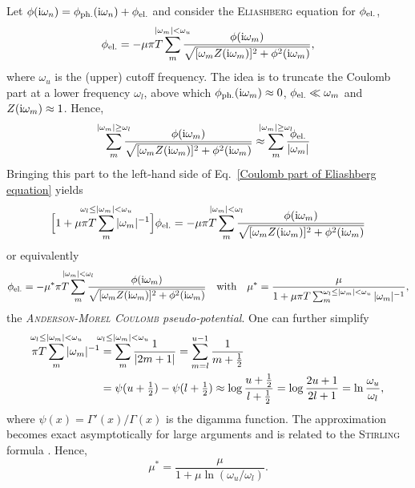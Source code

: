 Let $\phi(\mathrm i \omega_n) = \phi \sb{\text{ph.}} (\mathrm i \omega_n) + \phi \sb{\text{el.}}$ and
consider the \textsc{Eliashberg} equation for $\phi \sb{\text{el.}}$,
%
\begin{equation} \label{Coulomb part of Eliashberg equation}
    \phi \sub{el.} = -\mu \pi T \sum_m^{\mathclap{|\omega_m| < \omega_u}}
    \frac
        {\phi(\I \omega_m)}
        {\sqrt{[\omega_m Z(\I \omega_m)]^2 + \phi^2(\I \omega_m)}},
\end{equation}
%
where $\omega_u$ is the (upper) cutoff frequency. The idea is to truncate the
Coulomb part at a lower frequency $\omega_l$, above which $\phi \sb{\text{ph.}} (\mathrm i
\omega_m) \approx 0$, $\phi \sb{\text{el.}} \ll \omega_m$ and $Z(\mathrm i \omega_m) \approx
1$. Hence,
%
\begin{equation*}
    \sum_m^{\mathclap{|\omega_m| \geq \omega_l}}
    \frac
        {\phi(\I \omega_m)}
        {\sqrt{[\omega_m Z(\I \omega_m)]^2 + \phi^2(\I \omega_m)}}
    \approx \sum_m^{\mathclap{|\omega_m| \geq \omega_l}}
    \frac{\phi \sub{el.}}{|\omega_m|}
\end{equation*}
%
Bringing this part to the left-hand side of Eq.~\ref{Coulomb part of Eliashberg
equation} yields
%
\begin{equation*}
    \Big[
        1 + \mu \pi T \sum_m^{\mathclap{\omega_l \leq |\omega_m| < \omega_u}}
        |\omega_m|^{-1}
    \Big]
    \phi \sub{el.} = -\mu \pi T \sum_m^{\mathclap{|\omega_m| < \omega_l}}
    \frac
        {\phi(\I \omega_m)}
        {\sqrt{[\omega_m Z(\I \omega_m)]^2 + \phi^2(\I \omega_m)}}
\end{equation*}
%
or equivalently
%
\begin{equation*}
    \phi \sub{el.} = -\mu^* \pi T \sum_m^{\mathclap{|\omega_m| < \omega_l}}
    \frac
        {\phi(\I \omega_m)}
        {\sqrt{[\omega_m Z(\I \omega_m)]^2 + \phi^2(\I \omega_m)}}
    \quad \text{with} \quad
    \mu^* = \frac \mu {1 + \mu \pi T
    \sum_m^{\omega_l \leq |\omega_m| < \omega_u} |\omega_m|^{-1}},
\end{equation*}
%
the \emph{\textsc{Anderson-Morel} \textsc{Coulomb} pseudo-potential}. One can
further simplify
%
\begin{align*}
    \pi T \sum_m^{\mathclap{\omega_l \leq |\omega_m| < \omega_u}}
    |\omega_m|^{-1}
    &= \sum_m^{\mathclap{\omega_l \leq |\omega_m| < \omega_u}}
    \frac 1 {|2 m + 1|}
    = \sum_{m = l}^{u - 1} \frac 1 {m + \frac 1 2} \\
    &= \psi(u + \tfrac 1 2) - \psi(l + \tfrac 1 2)
    \approx \log \frac{u + \frac 1 2}{l + \frac 1 2}
    = \log \frac{2 u + 1}{2 l + 1} = \ln \frac{\omega_u}{\omega_l},
\end{align*}
%
where $\psi(x) = \varGamma'(x) / \varGamma(x)$ is the digamma function. The
approximation becomes exact asymptotically for large arguments and is related to
the \textsc{Stirling} formula \cite[Appendix~A]{AllenMitrovic82}. Hence,
%
\begin{equation*}
    \mu^* = \frac \mu {1 + \mu \ln(\omega_u / \omega_l)}.
\end{equation*}

